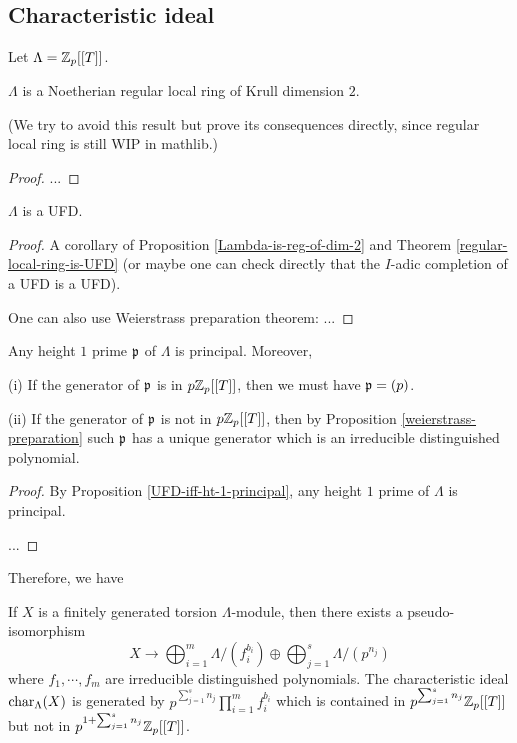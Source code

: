 \subsection{Characteristic ideal}

Let $\Lambda={\mathbb {Z}}_p[[T]]$.

\begin{prop}
\label{Lambda-is-reg-of-dim-2}
$\Lambda$ is a
Noetherian regular local ring of Krull dimension $2$.

(We try to avoid this result but prove its consequences directly,
since regular local ring is still WIP in mathlib.)
\end{prop}

\begin{proof}
...
\end{proof}

\begin{cor}
\label{Lambda-is-UFD}
$\Lambda$ is a UFD.
\end{cor}

\begin{proof}
A corollary of Proposition \ref{Lambda-is-reg-of-dim-2} and
Theorem \ref{regular-local-ring-is-UFD}
(or maybe one can check directly that the $I$-adic completion of a UFD is a UFD).

One can also use Weierstrass preparation theorem: ...
\end{proof}

\begin{cor}
\label{Lambda-ht-1-principal}
Any height $1$ prime ${\mathfrak{p}}$ of $\Lambda$
is principal. Moreover,

{\rm(i)}
If the generator of ${\mathfrak{p}}$ is in $p{\mathbb {Z}}_p[[T]]$, then
we must have ${\mathfrak{p}}=(p)$.

{\rm(ii)}
If the generator of ${\mathfrak{p}}$ is not in $p{\mathbb {Z}}_p[[T]]$, then
by Proposition \ref{weierstrass-preparation} such ${\mathfrak{p}}$
has a unique generator which is an irreducible distinguished polynomial.
\end{cor}

\begin{proof}
By Proposition \ref{UFD-iff-ht-1-principal}, any height $1$ prime of $\Lambda$
is principal.

...
\end{proof}

Therefore, we have

\begin{prop}
\label{Lambda-module-structure}
If $X$ is a finitely generated torsion $\Lambda$-module,
then there exists a pseudo-isomorphism
$$
X\to\bigoplus_{i=1}^m\Lambda/(f_i^{b_i})\oplus\bigoplus_{j=1}^s\Lambda/(p^{n_j})
$$
where $f_1,\cdots,f_m$ are irreducible distinguished polynomials.
The characteristic ideal $\operatorname{char}_\Lambda(X)$ is generated by
$p^{\sum_{j=1}^sn_j}\prod_{i=1}^mf_i^{b_i}$
which is contained in $p^{\sum_{j=1}^sn_j}{\mathbb {Z}}_p[[T]]$
but not in $p^{1+\sum_{j=1}^sn_j}{\mathbb {Z}}_p[[T]]$.
\end{prop}

